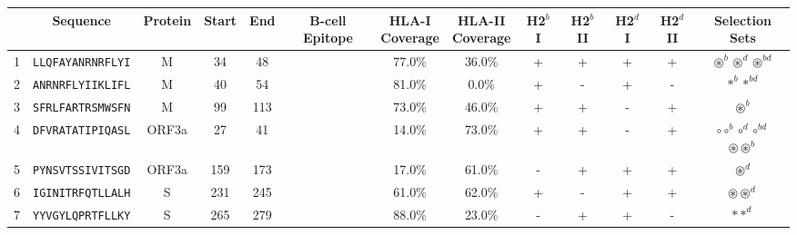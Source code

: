 \begin{tabular}{rcccccccccccc}
\toprule
{} &                  Sequence & Protein &  Start &   End & B-cell Epitope & \Centerstack{HLA-I \\ Coverage} & \Centerstack{HLA-II \\ Coverage} & H2$^{b}$ I & H2$^{b}$ II & H2$^{d}$ I & H2$^{d}$ II &                                                                         Selection Sets \\
\midrule
1  &  \texttt{LLQFAYANRNRFLYI} &       M &     34 &    48 &                &                          77.0\% &                           36.0\% &          + &           + &          + &           + &                                       $ \circledast^b \circledast^d \circledast^{bd} $ \\
2  &  \texttt{ANRNRFLYIIKLIFL} &       M &     40 &    54 &                &                          81.0\% &                            0.0\% &          + &           - &          + &           - &                                                                   $ \ast^b \ast^{bd} $ \\
3  &  \texttt{SFRLFARTRSMWSFN} &       M &     99 &   113 &                &                          73.0\% &                           46.0\% &          + &           + &          - &           + &                                                                      $ \circledast^b $ \\
4  &  \texttt{DFVRATATIPIQASL} &   ORF3a &     27 &    41 &                &                          14.0\% &                           73.0\% &          + &           + &          - &           + &    \Centerstack{  $\circ \circ^b \circ^d \circ^{bd}$ \\  $\circledast \circledast^b$ } \\
5  &  \texttt{PYNSVTSSIVITSGD} &   ORF3a &    159 &   173 &                &                          17.0\% &                           61.0\% &          - &           + &          + &           + &                                                                      $ \circledast^d $ \\
6  &  \texttt{IGINITRFQTLLALH} &       S &    231 &   245 &                &                          61.0\% &                           62.0\% &          + &           - &          + &           + &                                                          $ \circledast \circledast^d $ \\
7  &  \texttt{YYVGYLQPRTFLLKY} &       S &    265 &   279 &                &                          88.0\% &                           23.0\% &          - &           + &          + &           - &                                                                        $ \ast \ast^d $ \\

\end{tabular}
